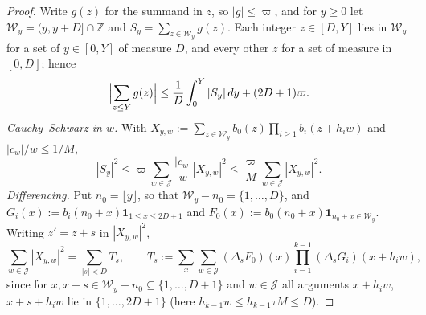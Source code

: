 \documentclass[preprint,12pt]{elsarticle}
\numberwithin{equation}{section}
\theoremstyle{plain}
\theoremstyle{definition}
\theoremstyle{definition}
\theoremstyle{remark}
\begin{document}
\begin{proof}
Write $g(z)$ for the summand in $z$, so $|g|\le\varpi$, and for $y\ge0$ let $\mathcal W_y=(y,y+D]\cap\mathbb Z$ and $S_y=\sum_{z\in\mathcal W_y}g(z)$. Each integer $z\in[D,Y]$ lies in $\mathcal W_y$ for a set of $y\in[0,Y]$ of measure $D$, and every other $z$ for a set of measure in $[0,D]$; hence
\begin{equation}
\Bigl|\sum_{z\le Y}g(z)\Bigr|\le\frac1D\int_0^Y|S_y|\,dy+(2D+1)\varpi .
\label{eq:windows}
\end{equation}
\emph{Cauchy--Schwarz in $w$.} With $X_{y,w}:=\sum_{z\in\mathcal W_y}b_0(z)\prod_{i\ge1}b_i(z+h_iw)$ and $|c_w|/w\le1/M$,
\begin{equation}
|S_y|^2\le\varpi\sum_{w\in\mathcal J}\frac{|c_w|}{w}|X_{y,w}|^2\le\frac{\varpi}{M}\sum_{w\in\mathcal J}|X_{y,w}|^2 .
\label{eq:cs_w}
\end{equation}
\emph{Differencing.} Put $n_0=\lfloor y\rfloor$, so that $\mathcal W_y-n_0=\{1,\dots,D\}$, and $G_i(x):=b_i(n_0+x)\mathbf 1_{1\le x\le 2D+1}$ and $F_0(x):=b_0(n_0+x)\mathbf 1_{n_0+x\in\mathcal W_y}$. Writing $z'=z+s$ in $|X_{y,w}|^2$,
\begin{equation}
\sum_{w\in\mathcal J}|X_{y,w}|^2=\sum_{|s|<D}T_s,\qquad T_s:=\sum_{x}\sum_{w\in\mathcal J}(\Delta_sF_0)(x)\prod_{i=1}^{k-1}(\Delta_sG_i)(x+h_iw),
\label{eq:Tk}
\end{equation}
since for $x,x+s\in\mathcal W_y-n_0\subseteq\{1,\dots,D+1\}$ and $w\in\mathcal J$ all arguments $x+h_iw$, $x+s+h_iw$ lie in $\{1,\dots,2D+1\}$ (here $h_{k-1}w\le h_{k-1}\tau M\le D$).


\end{proof}
\end{document}
